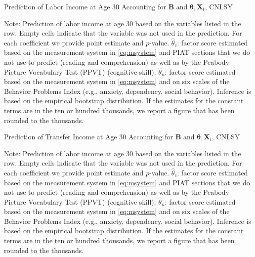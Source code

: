 \begin{table}
\begin{threeparttable}
\caption{Prediction of Labor Income at Age 30 Accounting for $\bm{B}$ and $\bm{\theta}, \bm{X}_{t}$, CNLSY}
\label{table:endoginc}
\centering
\footnotesize

\begin{tablenotes}
\footnotesize
\item Note: Prediction of labor income at age 30 based on the variables listed in the row. Empty cells indicate that the variable was not used in the prediction. For each coefficient we provide point estimate and $p$-value. $\hat{\theta}_{c}$: factor score estimated based on the measurement system in \eqref{eq:msystem} and PIAT sections that we do not use to predict (reading and comprehension) as well as by the Peabody Picture Vocabulary Test (PPVT) (cognitive skill). $\hat{\theta}_{n}$: factor score estimated based on the measurement system in \eqref{eq:msystem} and on six scales of the Behavior Problems Index (e.g., anxiety, dependency, social behavior). Inference is based on the empirical bootstrap distribution. If the estimates for the constant terms are in the ten or hundred thousands, we report a figure that has been rounded to the thousands.
\end{tablenotes}
\end{threeparttable}
\end{table}

\begin{table}
\begin{threeparttable}
\caption{Prediction of Transfer Income at Age 30 Accounting for $\bm{B}$ and $\bm{\theta}, \bm{X}_{t}$, CNLSY}
\label{table:endogti}
\centering
\scriptsize

\begin{tablenotes}
\footnotesize
\item Note: Prediction of labor income at age 30 based on the variables listed in the row. Empty cells indicate that the variable was not used in the prediction. For each coefficient we provide point estimate and $p$-value. $\hat{\theta}_{c}$: factor score estimated based on the measurement system in \eqref{eq:msystem} and PIAT sections that we do not use to predict (reading and comprehension) as well as by the Peabody Picture Vocabulary Test (PPVT) (cognitive skill). $\hat{\theta}_{n}$: factor score estimated based on the measurement system in \eqref{eq:msystem} and on six scales of the Behavior Problems Index (e.g., anxiety, dependency, social behavior). Inference is based on the empirical bootstrap distribution. If the estimates for the constant terms are in the ten or hundred thousands, we report a figure that has been rounded to the thousands.
\end{tablenotes}
\end{threeparttable}
\end{table}

